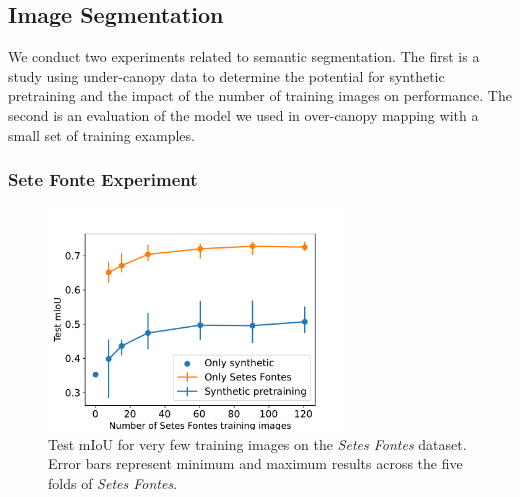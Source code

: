 \subsection{Image Segmentation}
We conduct two experiments related to semantic segmentation. The first is a study using under-canopy data to determine the potential for synthetic pretraining and the impact of the number of training images on performance. The second is an evaluation of the model we used in over-canopy mapping with a small set of training examples.
\subsubsection{Sete Fonte Experiment}

\begin{figure}[H]
    \centering
    \includegraphics[width=0.7\textwidth]{figs/results/semantic_segmentation/synthetic_experiments_mious.pdf}
    \caption{Test mIoU for very few training images on the \textit{Setes Fontes} dataset.
    Error bars represent minimum and maximum results across the five folds of \textit{Setes Fontes}.}
    \label{fig:results:semantic-size-pretraining}
\end{figure}

